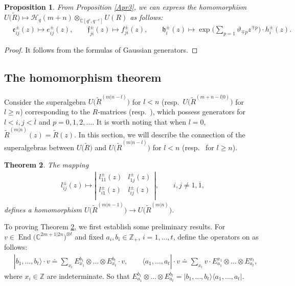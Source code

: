 \documentclass[10pt,a4paper]{amsart}
\numberwithin{equation}{section}
\newtheorem{Theorem}{Theorem}[section]
\newtheorem{Proposition}[Theorem]{Proposition}
 { \theoremstyle{definition}
\newtheorem{Definition}[Theorem]{Definition}
\newtheorem{Note}[Theorem]{Note}
\newtheorem{Example}[Theorem]{Example}
\newtheorem{Remark}[Theorem]{Remark} }
\begin{document}
\begin{Proposition}\label{Apr4}
From Proposition {\rm\ref{Apr3}}, we can express the homomorphism $U\bigl(\widetilde{R}\bigr)\mapsto\mathcal{H}_q(m+n)\otimes_{\mathbb{C}[q^c, q^{-c}]} U(R)$ as follows:
\begin{align*}
 & \mathfrak{e}_{ij}^{\pm}(z)\mapsto e_{ij}^{\pm}(z),\qquad \mathfrak{f}_{ji}^{\pm}(z)\mapsto f_{ji}^{\pm}(z),\qquad
 \mathfrak{h}_i^{\pm}(z)\mapsto \exp\biggl(\sum_{p=1}\vartheta_{\mp p}z^{\mp p}\biggr) \cdot h_i^{\pm}(z).
 \end{align*}
\end{Proposition}
\begin{proof}
It follows from the formulas of Gaussian generators.
\end{proof}




\subsection{The homomorphism theorem }
Consider the superalgebra $U\bigl(\widetilde{R}^{(m|n-l)}\bigr)$ for $l<n$ (resp.\ $U\bigl(\widetilde{R}^{(m+n-l|0)}\bigr)$ for $l\geq n$) corresponding to the $R$-matrices  (resp.\ ), which possess generators  for $l<i,j <\overline{l}$ and $p=0,1,2,\dots$.
It is worth noting that when $l=0$, $\widetilde{R}^{(m|n)}(z)=\widetilde{R}(z)$. In this section, we will describe the connection of the superalgebras between $U\bigl(\widetilde{R}\bigr)$ and $U\bigl(\widetilde{R}^{(m|n-l)}\bigr)$ for $l<n$ (resp.\  for $l\geq n$).

\begin{Theorem}\label{th1}
The mapping
\begin{align*}
l_{ij}^{\pm}(z)\mapsto
\left|
 \begin{matrix}
 l_{11}^{\pm}(z) & l_{1j}^{\pm}(z) \\
 l_{i1}^{\pm}(z) &\boxed{l_{ij}^{\pm}(z)} \\
 \end{matrix}
 \right|, \qquad i,j \neq1,\overline{1},
\end{align*}
defines a homomorphism $U\bigl(\widetilde{R}^{(m|n-1)}\bigr)\rightarrow U\bigl(\widetilde{R}^{(m|n)}\bigr)$.
\end{Theorem}


To proving Theorem \ref{th1}, we first establish some preliminary results. For $v\in \operatorname{End}\bigl(\mathbb{C}^{2m+1|2n}\bigr)^{\otimes t}$ and fixed $a_i,b_i\in\mathbb{Z}_+$, $i=1,\dots,t$, define the operators on  as follows:
\begin{align*}
 &|b_1,\dots, b_t\rangle\cdot v\doteq \sum\limits_{x_i} E_{x_1}^{b_1}\otimes \dots\otimes E_{x_t}^{b_t}\cdot v ,\qquad \langle a_1,\dots, a_t| \cdot v\doteq \sum\limits_{x_i}v\cdot E^{x_1}_{a_1}\otimes \dots\otimes E^{x_t}_{a_t},
\end{align*}
where $x_i\in\mathbb{Z}$ are indeterminate. So that $E_{a_1}^{b_1}\otimes \dots\otimes E_{a_t}^{b_t}=|b_1,\dots, b_t\rangle \langle a_1,\dots, a_t|$.
\end{document}
